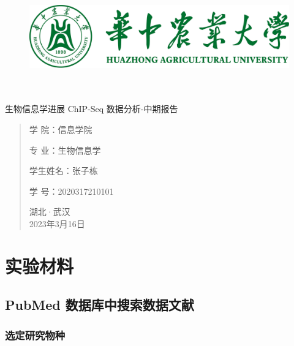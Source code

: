 \documentclass[UTF8]{ctexart}
\date{}
\begin{document}
\thispagestyle{empty}
\begin{figure}[t]
	\centering
	\includegraphics[scale=0.7]{img/HZAU.png}
\end{figure}

\begin{center}
	\quad \\
	\quad \\
	\heiti \fontsize{45}{17} 生物信息学进展
	\vskip 3.5cm
	\heiti {} ChIP-Seq 数据分析-中期报告
\end{center}
\vskip 3.5cm

\begin{quotation}
	\heiti \fontsize{15}{15}
	\doublespacing
	\par\setlength\parindent{12em}
	\quad

	学\hspace{0.61cm} 院：信息学院

	专\hspace{0.61cm} 业：生物信息学

	学生姓名：张子栋

	学\hspace{0.61cm} 号：2020317210101

	\vskip 2cm
	\centering
	湖北·武汉\\
	2023年3月16日
\end{quotation}

\clearpage
\thispagestyle{empty}
\quad

\clearpage

\thispagestyle{empty}
\tableofcontents
\setcounter{page}{0}

\clearpage

\section{实验材料}

\subsection{PubMed 数据库中搜索数据文献}

\subsubsection{选定研究物种}
\end{document}
